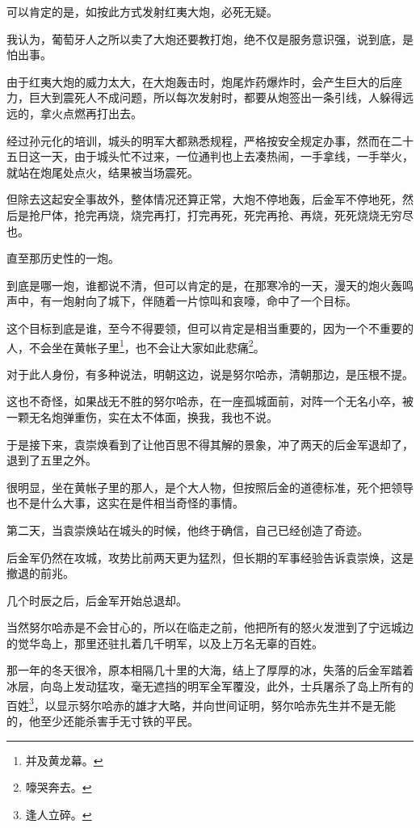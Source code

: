 \begin{multicols}{\theparacolNo}
可以肯定的是，如按此方式发射红夷大炮，必死无疑。

我认为，葡萄牙人之所以卖了大炮还要教打炮，绝不仅是服务意识强，说到底，是怕出事。

由于红夷大炮的威力太大，在大炮轰击时，炮尾炸药爆炸时，会产生巨大的后座力，巨大到震死人不成问题，所以每次发射时，都要从炮签出一条引线，人躲得远远的，拿火点燃再打出去。

经过孙元化的培训，城头的明军大都熟悉规程，严格按安全规定办事，然而在二十五日这一天，由于城头忙不过来，一位通判也上去凑热闹，一手拿线，一手举火，就站在炮尾处点火，结果被当场震死。

但除去这起安全事故外，整体情况还算正常，大炮不停地轰，后金军不停地死，然后是抢尸体，抢完再烧，烧完再打，打完再死，死完再抢、再烧，死死烧烧无穷尽也。

直至那历史性的一炮。

到底是哪一炮，谁都说不清，但可以肯定的是，在那寒冷的一天，漫天的炮火轰鸣声中，有一炮射向了城下，伴随着一片惊叫和哀嚎，命中了一个目标。

这个目标到底是谁，至今不得要领，但可以肯定是相当重要的，因为一个不重要的人，不会坐在黄帐子里\footnote{并及黄龙幕。}，也不会让大家如此悲痛\footnote{嚎哭奔去。}。

对于此人身份，有多种说法，明朝这边，说是努尔哈赤，清朝那边，是压根不提。

这也不奇怪，如果战无不胜的努尔哈赤，在一座孤城面前，对阵一个无名小卒，被一颗无名炮弹重伤，实在太不体面，换我，我也不说。

于是接下来，袁崇焕看到了让他百思不得其解的景象，冲了两天的后金军退却了，退到了五里之外。

很明显，坐在黄帐子里的那人，是个大人物，但按照后金的道德标准，死个把领导也不是什么大事，这实在是件相当奇怪的事情。

第二天，当袁崇焕站在城头的时候，他终于确信，自己已经创造了奇迹。

后金军仍然在攻城，攻势比前两天更为猛烈，但长期的军事经验告诉袁崇焕，这是撤退的前兆。

几个时辰之后，后金军开始总退却。

当然努尔哈赤是不会甘心的，所以在临走之前，他把所有的怒火发泄到了宁远城边的觉华岛上，那里还驻扎着几千明军，以及上万名无辜的百姓。

那一年的冬天很冷，原本相隔几十里的大海，结上了厚厚的冰，失落的后金军踏着冰层，向岛上发动猛攻，毫无遮挡的明军全军覆没，此外，士兵屠杀了岛上所有的百姓\footnote{逢人立碎。}，以显示努尔哈赤的雄才大略，并向世间证明，努尔哈赤先生并不是无能的，他至少还能杀害手无寸铁的平民。


\end{multicols}
